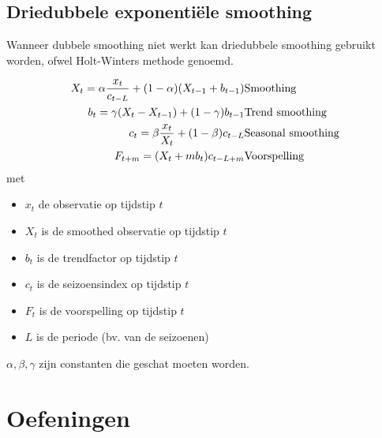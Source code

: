\subsection{Driedubbele exponenti\"ele smoothing}
Wanneer dubbele smoothing niet werkt kan driedubbele smoothing gebruikt worden, ofwel Holt-Winters methode genoemd.

\begin{eqnarray}
	X_{t} = \alpha \frac{x_{t}}{c_{t-L}} + (1-\alpha) (X_{t-1} + b_{t-1}) & \textnormal{Smoothing}\\
	b_{t} = \gamma (X_{t} - X_{t-1}) + (1-\gamma)b_{t-1} & \textnormal{Trend smoothing} \\
	c_{t} = \beta \frac{x_{t}}{X_{t}} + (1-\beta)c_{t-L} & \textnormal{Seasonal smoothing} \\
	F_{t+m} = (X_{t} + mb_{t})c_{t-L+m} & \textnormal{Voorspelling}
\label{eq:HoltWinters}
\end{eqnarray}
 met 
\begin{itemize}
	\item $x_{t}$ de observatie op tijdstip $t$
	\item $X_{t}$ is de smoothed observatie op tijdstip $t$
	\item $b_{t}$ is de trendfactor op tijdstip $t$
	\item $c_{t}$ is de seizoensindex op tijdstip $t$
	\item $F_{t}$ is de voorspelling op tijdstip $t$
	\item $L$ is de periode (bv. van de seizoenen)
\end{itemize}

$\alpha, \beta, \gamma$ zijn constanten die geschat moeten worden. 


\section{Oefeningen}
\label{sec:tijdreeksen-oefeningen}

